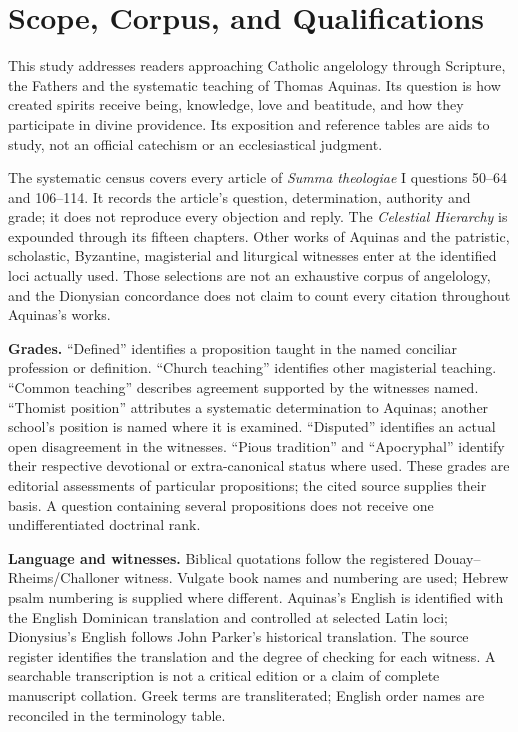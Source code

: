 \section{Scope, Corpus, and Qualifications}
\label{app:scope}

This study addresses readers approaching Catholic angelology through
Scripture, the Fathers and the systematic teaching of Thomas Aquinas.
Its question is how created spirits receive being, knowledge, love and
beatitude, and how they participate in divine providence. Its exposition
and reference tables are aids to study, not an official catechism or an
ecclesiastical judgment.

The systematic census covers every article of \emph{Summa theologiae} I
questions 50--64 and 106--114. It records the article's question,
determination, authority and grade; it does not reproduce every objection
and reply. The \emph{Celestial Hierarchy} is expounded through its fifteen
chapters. Other works of Aquinas and the patristic, scholastic, Byzantine,
magisterial and liturgical witnesses enter at the identified loci actually
used. Those selections are not an exhaustive corpus of angelology, and the
Dionysian concordance does not claim to count every citation throughout
Aquinas's works.

\textbf{Grades.} ``Defined'' identifies a proposition taught in the named
conciliar profession or definition. ``Church teaching'' identifies other
magisterial teaching. ``Common teaching'' describes agreement supported by
the witnesses named. ``Thomist position'' attributes a systematic
determination to Aquinas; another school's position is named where it is
examined. ``Disputed'' identifies an actual open disagreement in the
witnesses. ``Pious tradition'' and ``Apocryphal'' identify
their respective devotional or extra-canonical status where used. These
grades are editorial assessments of particular propositions; the cited
source supplies their basis. A question containing several propositions
does not receive one undifferentiated doctrinal rank.

\textbf{Language and witnesses.} Biblical quotations follow the registered
Douay--Rheims/Challoner witness. Vulgate book names and numbering are used;
Hebrew psalm numbering is supplied where different. Aquinas's English is
identified with the English Dominican translation and controlled at selected
Latin loci; Dionysius's English follows John Parker's historical translation.
The source register identifies the translation and the degree of checking
for each witness. A searchable transcription is not a critical edition or
a claim of complete manuscript collation. Greek terms are transliterated;
English order names are reconciled in the terminology table.

